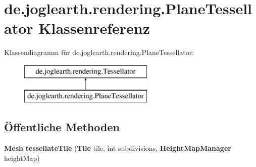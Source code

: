\section{de.\-joglearth.\-rendering.\-Plane\-Tessellator Klassenreferenz}
\label{classde_1_1joglearth_1_1rendering_1_1_plane_tessellator}
Klassendiagramm für de.\-joglearth.\-rendering.\-Plane\-Tessellator\-:\begin{figure}[H]
\begin{center}
\leavevmode
\includegraphics[height=2.000000cm]{classde_1_1joglearth_1_1rendering_1_1_plane_tessellator}
\end{center}
\end{figure}
\subsection*{Öffentliche Methoden}
\begin{DoxyCompactItemize}
\item 
{\bf Mesh} {\bfseries tessellate\-Tile} ({\bf Tile} tile, int subdivisions, {\bf Height\-Map\-Manager} height\-Map)\label{classde_1_1joglearth_1_1rendering_1_1_plane_tessellator_ad8fb35a18af60f6285090669a6d41c52}

\end{DoxyCompactItemize}
